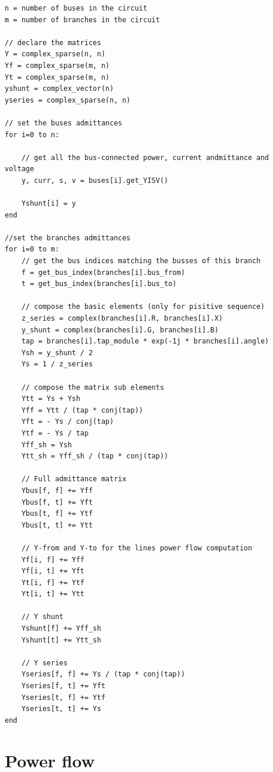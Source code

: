 \documentclass[nols,a4paper,twoside,notoc,fleqn]{tufte-book}
\begin{document}
{\color{verbatimcolor}
\begin{verbatim}
n = number of buses in the circuit
m = number of branches in the circuit

// declare the matrices
Y = complex_sparse(n, n)
Yf = complex_sparse(m, n)
Yt = complex_sparse(m, n)
yshunt = complex_vector(n)
yseries = complex_sparse(n, n)

// set the buses admittances
for i=0 to n:

    // get all the bus-connected power, current andmittance and voltage
    y, curr, s, v = buses[i].get_YISV()

    Yshunt[i] = y
end

//set the branches admittances
for i=0 to m:
    // get the bus indices matching the busses of this branch
    f = get_bus_index(branches[i].bus_from)
    t = get_bus_index(branches[i].bus_to)
    
    // compose the basic elements (only for pisitive sequence)
    z_series = complex(branches[i].R, branches[i].X)
    y_shunt = complex(branches[i].G, branches[i].B)
    tap = branches[i].tap_module * exp(-1j * branches[i].angle)
    Ysh = y_shunt / 2
    Ys = 1 / z_series

    // compose the matrix sub elements
    Ytt = Ys + Ysh
    Yff = Ytt / (tap * conj(tap))
    Yft = - Ys / conj(tap)
    Ytf = - Ys / tap    
    Yff_sh = Ysh
    Ytt_sh = Yff_sh / (tap * conj(tap))
    
    // Full admittance matrix
    Ybus[f, f] += Yff
    Ybus[f, t] += Yft
    Ybus[t, f] += Ytf
    Ybus[t, t] += Ytt
    
    // Y-from and Y-to for the lines power flow computation
    Yf[i, f] += Yff
    Yf[i, t] += Yft
    Yt[i, f] += Ytf
    Yt[i, t] += Ytt
    
    // Y shunt
    Yshunt[f] += Yff_sh
    Yshunt[t] += Ytt_sh
    
    // Y series
    Yseries[f, f] += Ys / (tap * conj(tap))
    Yseries[f, t] += Yft
    Yseries[t, f] += Ytf
    Yseries[t, t] += Ys
end

\end{verbatim}
}


\chapter{Power flow} \label{ch:power_flow}
\end{document}

